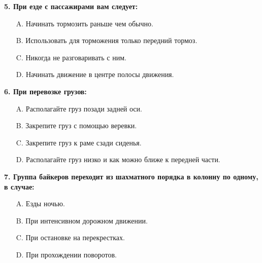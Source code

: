 \begin{minipage}{\linewidth}
\vspace{1em}\noindent\textbf{5. При езде с пассажирами вам следует:}

\begin{itemize}[nosep,leftmargin=2em]
\item [A.] Начинать тормозить раньше чем обычно.
\item [B.] Использовать для торможения только передний тормоз.
\item [C.] Никогда не разговаривать с ним.
\item [D.] Начинать движение в центре полосы движения.

\end{itemize}
\end{minipage}


\begin{minipage}{\linewidth}
\vspace{1em}\noindent\textbf{6. При перевозке грузов:}

\begin{itemize}[nosep,leftmargin=2em]
\item [A.] Располагайте груз позади задней оси.
\item [B.] Закрепите груз с помощью веревки.
\item [C.] Закрепите груз к раме сзади сиденья.
\item [D.] Располагайте груз низко и как можно ближе к передней части.

\end{itemize}
\end{minipage}


\begin{minipage}{\linewidth}
\vspace{1em}\noindent\textbf{7. Группа байкеров переходит из шахматного порядка в колонну по одному, в случае:}

\begin{itemize}[nosep,leftmargin=2em]
\item [A.] Езды ночью.
\item [B.] При интенсивном дорожном движении.
\item [C.] При остановке на перекрестках.
\item [D.] При прохождении поворотов.

\end{itemize}
\end{minipage}


